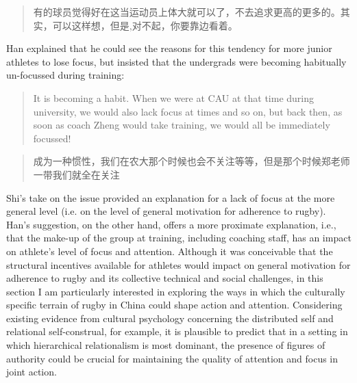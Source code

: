 \begin{CJK}{UTF8}{gbsn}
  \begin{quotation}
    有的球员觉得好在这当运动员上体大就可以了，不去追求更高的更多的。其实，可以这样想，但是,对不起，你要靠边看着。
  \end{quotation}



  Han explained that he could see the reasons for this tendency for more junior athletes to lose focus, but insisted that the undergrads were becoming habitually un-focussed during training:

  \begin{quotation}
    It is becoming a habit.  When we were at CAU at that time during university, we would also lack focus at times and so on, but back then, as soon as coach Zheng would take training, we would all be immediately focussed!
  \end{quotation}


  \begin{quotation}
      成为一种惯性，我们在农大那个时候也会不关注等等，但是那个时候郑老师一带我们就全在关注
  \end{quotation}



  Shi's take on the issue provided an explanation for a lack of focus at the more general level (i.e. on the level of general motivation for adherence to rugby).  Han's suggestion, on the other hand, offers a more proximate explanation, i.e., that the make-up of the group at training, including coaching staff, has an impact on athlete's level of focus and attention.  Although it was conceivable that the structural incentives available for athletes would impact on general motivation for adherence to rugby and its collective technical and social challenges, in this section I am particularly interested in exploring the ways in which the culturally specific terrain of rugby in China could shape action and attention.  Considering existing evidence from cultural psychology concerning the distributed self and relational self-construal, for example, it is plausible to predict that in a setting in which hierarchical relationalism is most dominant, the presence of figures of authority could be crucial for maintaining the quality of attention and focus in joint action.



\end{CJK}
